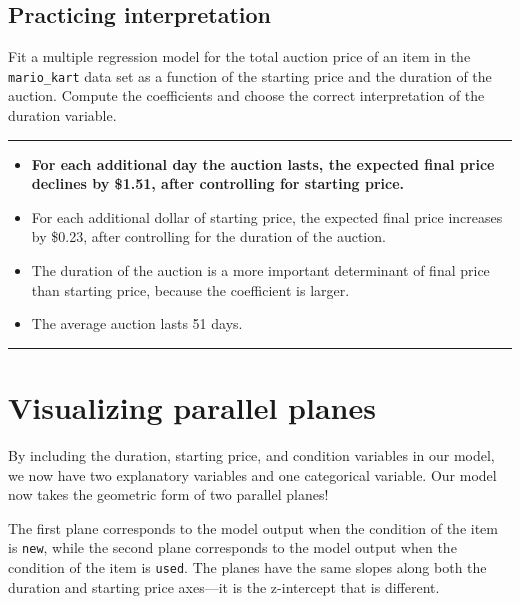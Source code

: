 \documentclass[]{book}
\begin{document}
\subsection*{Practicing interpretation}\label{practicing-interpretation}

Fit a multiple regression model for the total auction price of an item
in the \texttt{mario\_kart} data set as a function of the starting price
and the duration of the auction. Compute the coefficients and choose the
correct interpretation of the duration variable.

\begin{center}\rule{0.5\linewidth}{\linethickness}\end{center}

\begin{itemize}
\item
  \textbf{For each additional day the auction lasts, the expected final
  price declines by \$1.51, after controlling for starting price.}
\item
  For each additional dollar of starting price, the expected final price
  increases by \$0.23, after controlling for the duration of the
  auction.
\item
  The duration of the auction is a more important determinant of final
  price than starting price, because the coefficient is larger.
\item
  The average auction lasts 51 days.
\end{itemize}

\begin{center}\rule{0.5\linewidth}{\linethickness}\end{center}

\section{Visualizing parallel planes}\label{visualizing-parallel-planes}

By including the duration, starting price, and condition variables in
our model, we now have two explanatory variables and one categorical
variable. Our model now takes the geometric form of two parallel planes!

The first plane corresponds to the model output when the condition of
the item is \texttt{new}, while the second plane corresponds to the
model output when the condition of the item is \texttt{used}. The planes
have the same slopes along both the duration and starting price
axes---it is the z-intercept that is different.
\end{document}
